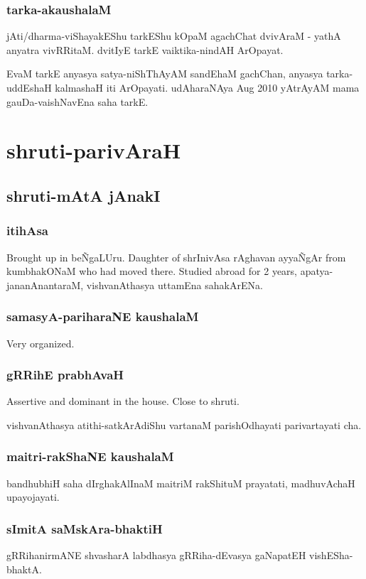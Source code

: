 \documentclass[oneside, article]{memoir}
\begin{document}
\section{tarka-akaushalaM}
jAti/dharma-viShayakEShu tarkEShu kOpaM agachChat dvivAraM - yathA anyatra vivRRitaM. dvitIyE tarkE vaiktika-nindAH ArOpayat.

EvaM tarkE anyasya satya-niShThAyAM sandEhaM gachChan, anyasya tarka-uddEshaH kalmashaH iti ArOpayati. udAharaNAya Aug 2010 yAtrAyAM mama gauDa-vaishNavEna saha tarkE.

\part{shruti-parivAraH}
\chapter{shruti-mAtA jAnakI}
\section{itihAsa}
Brought up in be\~NgaLUru. Daughter of shrInivAsa rAghavan ayya\~NgAr from kumbhakONaM who had moved there. Studied abroad for 2 years, apatya-jananAnantaraM, vishvanAthasya uttamEna sahakArENa.

\section{samasyA-pariharaNE kaushalaM}
Very organized.

\section{gRRihE prabhAvaH}
Assertive and dominant in the house. Close to shruti.

vishvanAthasya atithi-satkArAdiShu vartanaM parishOdhayati parivartayati cha.

\section{maitri-rakShaNE kaushalaM}
bandhubhiH saha dIrghakAlInaM maitriM rakShituM prayatati, madhuvAchaH upayojayati.

\section{sImitA saMskAra-bhaktiH}
gRRihanirmANE shvasharA labdhasya gRRiha-dEvasya gaNapatEH vishESha-bhaktA.
\end{document}
